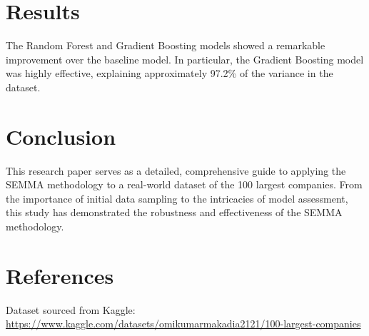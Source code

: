 \documentclass[12pt]{article}
\begin{document}
\section{Results}

The Random Forest and Gradient Boosting models showed a remarkable improvement over the baseline model. In particular, the Gradient Boosting model was highly effective, explaining approximately 97.2\% of the variance in the dataset. 

\section{Conclusion}

This research paper serves as a detailed, comprehensive guide to applying the SEMMA methodology to a real-world dataset of the 100 largest companies. From the importance of initial data sampling to the intricacies of model assessment, this study has demonstrated the robustness and effectiveness of the SEMMA methodology. 

\section{References}

Dataset sourced from Kaggle: \url{https://www.kaggle.com/datasets/omikumarmakadia2121/100-largest-companies}
\end{document}
